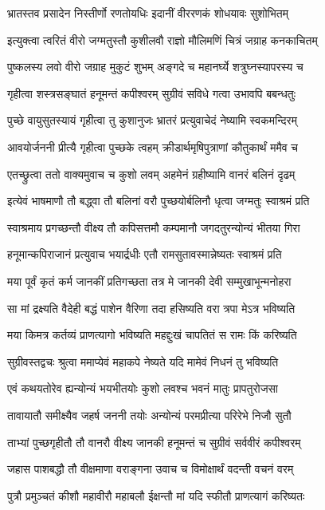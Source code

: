 \twolineshloka
{भ्रातस्तव प्रसादेन निस्तीर्णो रणतोयधिः}
{इदानीं वीररणकं शोधयावः सुशोभितम्}%

\twolineshloka
{इत्युक्त्वा त्वरितं वीरो जग्मतुस्तौ कुशीलवौ}
{राज्ञो मौलिमणिं चित्रं जग्राह कनकाचितम्}%

\twolineshloka
{पुष्कलस्य लवो वीरो जग्राह मुकुटं शुभम्}
{अङ्गदे च महानर्घ्ये शत्रुघ्नस्यापरस्य च}%

\twolineshloka
{गृहीत्वा शस्त्रसङ्घातं हनूमन्तं कपीश्वरम्}
{सुग्रीवं सविधे गत्वा उभावपि बबन्धतुः}%

\twolineshloka
{पुच्छे वायुसुतस्यायं गृहीत्वा तु कुशानुजः}
{भ्रातरं प्रत्युवाचेदं नेष्यामि स्वकमन्दिरम्}%

\twolineshloka
{आवयोर्जननी प्रीत्यै गृहीत्वा पुच्छके त्वहम्}
{क्रीडार्थमृषिपुत्राणां कौतुकार्थं ममैव च}%

\twolineshloka
{एतच्छ्रुत्वा ततो वाक्यमुवाच च कुशो लवम्}
{अहमेनं ग्रहीष्यामि वानरं बलिनं दृढम्}%

\twolineshloka
{इत्येवं भाषमाणौ तौ बद्ध्वा तौ बलिनां वरौ}
{पुच्छयोर्बलिनौ धृत्वा जग्मतुः स्वाश्रमं प्रति}%

\twolineshloka
{स्वाश्रमाय प्रगच्छन्तौ वीक्ष्य तौ कपिसत्तमौ}
{कम्पमानौ जगदतुरन्योन्यं भीतया गिरा}%

\twolineshloka
{हनूमान्कपिराजानं प्रत्युवाच भयार्द्रधीः}
{एतौ रामसुतावस्मान्नेष्यतः स्वाश्रमं प्रति}%

\twolineshloka
{मया पूर्वं कृतं कर्म जानकीं प्रतिगच्छता}
{तत्र मे जानकी देवी सम्मुखाभून्मनोहरा}%

\twolineshloka
{सा मां द्रक्ष्यति वैदेही बद्धं पाशेन वैरिणा}
{तदा हसिष्यति वरा त्रपा मेऽत्र भविष्यति}%

\twolineshloka
{मया किमत्र कर्तव्यं प्राणत्यागो भविष्यति}
{महद्दुःखं चापतितं स रामः किं करिष्यति}%

\twolineshloka
{सुग्रीवस्तद्वचः श्रुत्वा ममाप्येवं महाकपे}
{नेष्यते यदि मामेवं निधनं तु भविष्यति}%

\twolineshloka
{एवं कथयतोरेव ह्यन्योन्यं भयभीतयोः}
{कुशो लवश्च भवनं मातुः प्रापतुरोजसा}%

\twolineshloka
{तावायातौ समीक्ष्यैव जहर्ष जननी तयोः}
{अन्योन्यं परमप्रीत्या परिरेभे निजौ सुतौ}%

\twolineshloka
{ताभ्यां पुच्छगृहीतौ तौ वानरौ वीक्ष्य जानकी}
{हनूमन्तं च सुग्रीवं सर्ववीरं कपीश्वरम्}%

\twolineshloka
{जहास पाशबद्धौ तौ वीक्षमाणा वराङ्गना}
{उवाच च विमोक्षार्थं वदन्ती वचनं वरम्}%

\twolineshloka
{पुत्रौ प्रमुञ्चतं कीशौ महावीरौ महाबलौ}
{ईक्षन्तौ मां यदि स्फीतौ प्राणत्यागं करिष्यतः}%

